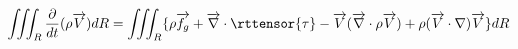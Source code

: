 \begin{equation}
  \iiint_R\frac{\partial}{dt}(\rho\overrightarrow{V})dR = \iiint_R\{\rho \overrightarrow{f_g} + \overrightarrow{\nabla}\cdot\rttensor{\tau} - \overrightarrow{V}(\overrightarrow{\nabla}\cdot \rho\overrightarrow{V}) + \rho(\overrightarrow{V}\cdot\nabla)\overrightarrow{V}\}dR
\end{equation}

